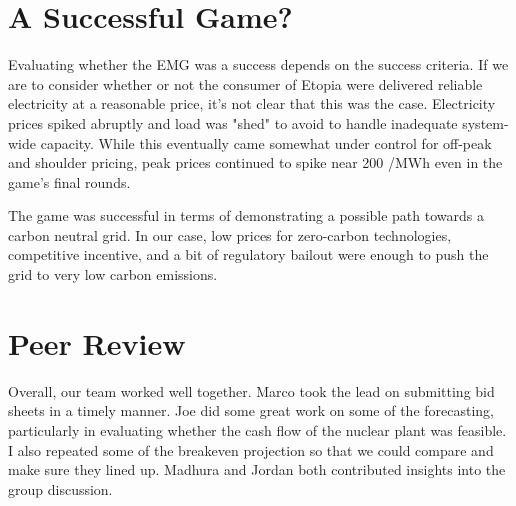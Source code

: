 \documentclass[journal,11pt]{IEEEtran}
\begin{document}
\section{A Successful Game?}

Evaluating whether the EMG was a success depends on the success criteria. If we are to consider whether or not the consumer of Etopia were delivered reliable electricity at a reasonable
price, it's not clear that this was the case. Electricity prices spiked abruptly and load was "shed" to avoid to handle inadequate system-wide capacity. While this eventually came
somewhat under control for off-peak and shoulder pricing, peak prices continued to spike near 200 \texteuro/MWh even in the game's final rounds.

The game was successful in terms of demonstrating a possible path towards a carbon neutral grid. In our case, low prices for zero-carbon technologies, competitive incentive, and a bit
of regulatory bailout were enough to push the grid to very low carbon emissions.

\section{Peer Review}

Overall, our team worked well together. Marco took the lead on submitting bid sheets in a timely manner. Joe did some great work on some of the forecasting, particularly in evaluating
whether the cash flow of the nuclear plant was feasible. I also repeated some of the breakeven projection so that we could compare and make sure they lined up. Madhura and Jordan both
contributed insights into the group discussion.















% 
% 
% 
% 
% 
% 
% 
\end{document}

